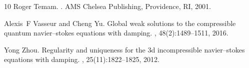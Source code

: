 \documentclass[preprint,12pt]{elsarticle}
\begin{document}
\begin{thebibliography}{10}
Roger Temam.
.
\newblock AMS Chelsea Publishing, Providence, RI, 2001.

Alexis~F Vasseur and Cheng Yu.
\newblock Global weak solutions to the compressible quantum navier--stokes equations with damping.
, 48(2):1489--1511, 2016.

Yong Zhou.
\newblock Regularity and uniqueness for the 3d incompressible navier--stokes equations with damping.
, 25(11):1822--1825, 2012.

\end{thebibliography}







\end{document}
